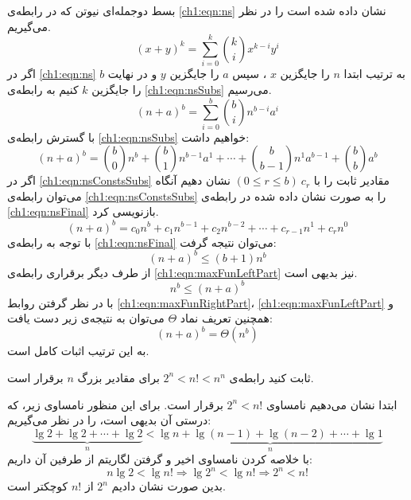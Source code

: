 بسط دوجمله‌ای نیوتن که در رابطه‌ی {\eqref{ch1:eqn:ns}} نشان داده شده است را در نظر می‌گیریم.
\begin{equation}
(x+y)^k=\sum_{i=0}^{k}{\binom{k}{i}x^{k-i}y^i}\label{ch1:eqn:ns}
\end{equation}
اگر در {\eqref{ch1:eqn:ns}} به ترتیب ابتدا {$n$} را جایگزین {$x$} ، سپس {$a$}  را جایگزین {$y$} و در نهایت {$b$} را جایگزین {$k$} کنیم به رابطه‌ی {\eqref{ch1:eqn:nsSubs}} می‌رسیم.
\begin{equation}
(n+a)^b=\sum_{i=0}^{b}{\binom{b}{i}n^{b-i}a^i}\label{ch1:eqn:nsSubs}
\end{equation}
با گسترش رابطه‌ی {\eqref{ch1:eqn:nsSubs}} خواهیم داشت:
\begin{equation}
(n+a)^b=\binom{b}{0}n^b + \binom{b}{1}n^{b-1}a^1 + \cdots +\binom{b}{b-1}n^1a^{b-1}+ \binom{b}{b}a^b\label{ch1:eqn:nsConstsSubs}
\end{equation}
اگر در {\eqref{ch1:eqn:nsConstsSubs}} مقادیر ثابت را با {$(0\leqslant r \leqslant b)\ c_r$} نشان دهیم آنگاه می‌توان رابطه‌ی {\eqref{ch1:eqn:nsConstsSubs}} را به صورت نشان داده شده در رابطه‌ی {\eqref{ch1:eqn:nsFinal}} بازنویسی کرد.
\begin{equation}
(n+a)^b=c_0n^b + c_1n^{b-1} + c_2n^{b-2}+ \cdots +c_{r-1}n^1+ c_rn^0\label{ch1:eqn:nsFinal}
\end{equation}
با توجه به رابطه‌ی {\eqref{ch1:eqn:nsFinal}} می‌توان نتیجه گرفت:
\begin{equation}
(n+a)^b \leq (b+1)n^b\label{ch1:eqn:maxFunRightPart}
\end{equation}
از طرف دیگر برقراری رابطه‌ی {\eqref{ch1:eqn:maxFunLeftPart}} نیز بدیهی است.
\begin{equation}
n^b \leq {(n+a)}^b\label{ch1:eqn:maxFunLeftPart}
\end{equation}
با در نظر گرفتن روابط {\eqref{ch1:eqn:maxFunRightPart}}، {\eqref{ch1:eqn:maxFunLeftPart}} و همچنین تعریف نماد {$\Theta$} می‌توان به نتیجه‌‌ی زیر دست یافت:
\begin{displaymath}
(n+a)^b=\Theta (n^b)
\end{displaymath}
به این ترتیب اثبات کامل است.

 ثابت کنید رابطه‌ی {$2^n < n! < n^n$} برای مقادیر بزرگ {$n$} برقرار است.


ابتدا نشان می‌دهیم نامساوی {$2^n < n!$} برقرار است. برای این منظور نامساوی زیر، که درستی آن بدیهی است، را در نظر می‌گیریم:
\begin{displaymath}
\underbrace{\lg 2 + \lg 2 + \cdots + \lg 2}_{n} < \underbrace{\lg n + \lg (n-1) + \lg (n-2) + \cdots + \lg 1}_{n}
\end{displaymath}
با خلاصه کردن نامساوی اخیر و گرفتن لگاریتم از طرفین آن داریم:
\begin{displaymath}
n\lg 2 < \lg n! \Rightarrow \lg 2^n < \lg n! \Rightarrow 2^n < n!
\end{displaymath}
بدین صورت نشان دادیم {$2^n$} از {$n!$} کوچکتر است.

